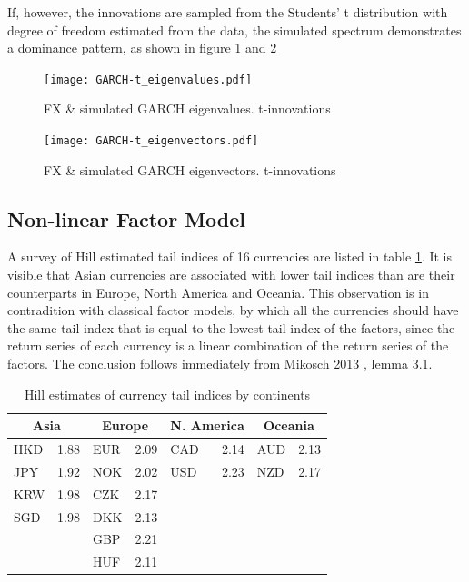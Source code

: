 \documentclass{article}
\begin{document}
If, however, the innovations are sampled from the Students' t
distribution with degree of freedom estimated from the data, the
simulated spectrum demonstrates a dominance pattern, as shown in
figure \ref{fig:GARCH-t_eigenvalues} and
\ref{fig:GARCH-t_eigenvectors}
\begin{figure}[htb!]
  \centering
  \texttt{[image: GARCH-t\_eigenvalues.pdf]}  
  \caption{FX \& simulated GARCH eigenvalues. t-innovations}
  \label{fig:GARCH-t_eigenvalues}
\end{figure}

\begin{figure}[htb!]
  \centering
  \texttt{[image: GARCH-t\_eigenvectors.pdf]}  
  \caption{FX \& simulated GARCH eigenvectors. t-innovations}
  \label{fig:GARCH-t_eigenvectors}
\end{figure}


\subsection{Non-linear Factor Model}
A survey of Hill estimated tail indices of 16 currencies are listed in
table \ref{tab:currencies_hill_estimate}. It is visible that Asian
currencies are associated with lower tail indices than are their
counterparts in Europe, North America and Oceania. This observation is
in contradition with classical factor models, by which all the
currencies should have the same tail index that is equal to the lowest
tail index of the factors, since the return series of each currency is
a linear combination of the return series of the factors. The
conclusion follows immediately from Mikosch 2013 \cite{Mikosch2013},
lemma 3.1.
\begin{table}[htb!]
  \begin{tabular}{lr|lr|lr|lr}
    \multicolumn{2}{c|}{Asia} & \multicolumn{2}{|c}{Europe} &
    \multicolumn{2}{|c}{N. America} & \multicolumn{2}{|c}{Oceania}\\
    \hline
    HKD & 1.88 & EUR & 2.09 & CAD & 2.14 & AUD & 2.13 \\
    JPY & 1.92 & NOK & 2.02 & USD & 2.23 & NZD & 2.17 \\
    KRW & 1.98 & CZK & 2.17 & & & &\\
    SGD & 1.98 & DKK & 2.13 & & & & \\
    & &          GBP & 2.21 & & & & \\
    & &          HUF & 2.11 & & & &
  \end{tabular}
  \caption{Hill estimates of currency tail indices by continents}
  \label{tab:currencies_hill_estimate}
\end{table}
\end{document}
